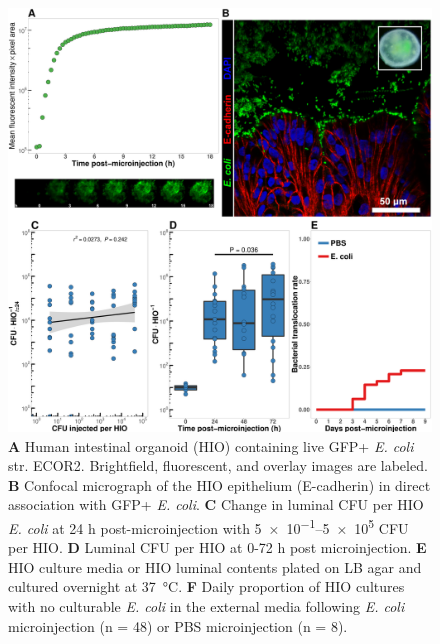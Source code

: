 \documentclass[9pt,lineo]{elife}
\begin{document}
\begin{figure}
\begin{fullwidth}
\includegraphics[width=0.95\linewidth]{./figures/figure1/figure1_multipanel.pdf}
\caption{\textbf{A} Human intestinal organoid (HIO) containing live GFP+ \textit{E. coli} str. ECOR2. Brightfield, fluorescent, and overlay images are labeled. \textbf{B} Confocal micrograph of the HIO epithelium (E-cadherin) in direct association with GFP+ \textit{E. coli}. \textbf{C} Change in luminal CFU per HIO \textit{E. coli} at 24 h post-microinjection with \numrange{5e-1}{5e5} CFU per HIO. \textbf{D} Luminal CFU per HIO at 0-72 h post microinjection. \textbf{E} HIO culture media or HIO luminal contents plated on LB agar and cultured overnight at \SI{37}{\celsius}. \textbf{F} Daily proportion of HIO cultures with no culturable \textit{E. coli} in the external media following \textit{E. coli} microinjection (n = 48) or PBS microinjection (n = 8).}
\label{fig:fullwidth}
\end{fullwidth}
\end{figure}
\end{document}
